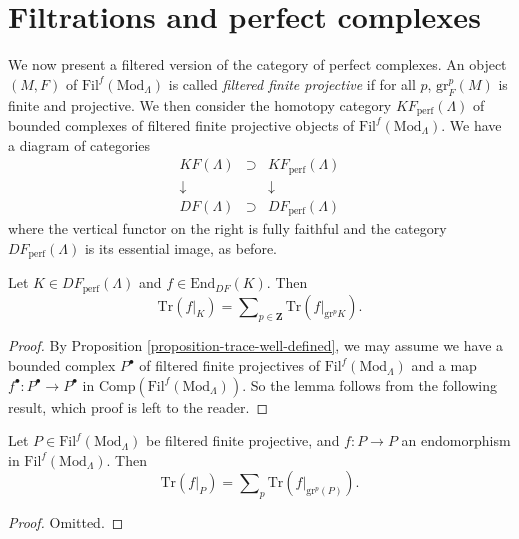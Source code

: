 \section{Filtrations and perfect complexes}
\label{section-filtrations-perfect}

\noindent
We now present a filtered version of the category of perfect complexes. An
object $(M, F)$ of $\text{Fil}^f(\text{Mod}_\Lambda)$ is called {\it filtered
finite projective} if for all $p$, $\text{gr}^p_F (M)$ is finite and
projective. We then consider the homotopy category
$KF_{\text{perf}}(\Lambda)$ of bounded complexes of filtered finite
projective objects of $\text{Fil}^f(\text{Mod}_\Lambda)$. We have a diagram of
categories
$$
\begin{matrix}
KF(\Lambda) & \supset & KF_{\text{perf}}(\Lambda)\\
\downarrow & & \downarrow\\
DF(\Lambda) & \supset & DF_{\text{perf}}(\Lambda)
\end{matrix}
$$
where the vertical functor on the right is fully faithful and the category
$DF_{\text{perf}}(\Lambda)$ is its essential image, as before.

\begin{lemma}[Additivity]
\label{lemma-additivity}
Let $K\in DF_{\text{perf}}(\Lambda)$ and $f\in
\text{End}_{DF}(K)$. Then
$$
\text{Tr}(f|_K) =
\sum\nolimits_{p\in \mathbf{Z}} \text{Tr}(f|_{\text{gr}^p K}).
$$
\end{lemma}

\begin{proof}
By Proposition \ref{proposition-trace-well-defined}, we may assume we have
a bounded
complex $P^\bullet$ of filtered finite projectives of
$\text{Fil}^f(\text{Mod}_\Lambda)$ and a map $f^\bullet : P^\bullet\to
P^\bullet$ in $\text{Comp}(\text{Fil}^f(\text{Mod}_\Lambda))$. So the lemma
follows from the following result, which proof is left to the reader.
\end{proof}

\begin{lemma}
\label{lemma-additive-filtered-finite-projective}
Let $P \in \text{Fil}^f(\text{Mod}_\Lambda)$ be filtered finite projective, and
$f : P \to P$ an endomorphism in $\text{Fil}^f(\text{Mod}_\Lambda)$. Then
$$
\text{Tr}(f|_P) =
\sum\nolimits_p \text{Tr}(f|_{\text{gr}^p(P)}).
$$
\end{lemma}

\begin{proof}
Omitted.
\end{proof}







